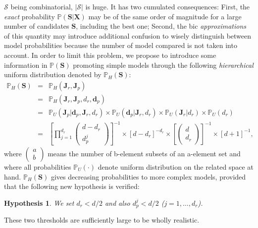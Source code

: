 \documentclass[12pt,a4paper]{report}
\newtheorem{hyp}{Hypothesis}
\begin{document}
	$\mathcal{S}$ being combinatorial, $|\mathcal{S}|$ is huge. It has two cumulated consequences: First, the {\it exact} probability $\mathbb{P}(\boldsymbol{S}|\boldsymbol{X})$ may be of the same order of magnitude for a large number of candidates  $\boldsymbol{S}$, including the best one; Second, the {\sc bic} {\it approximations} of this quantity may introduce additional confusion to wisely distinguish between model probabilities because the number of model compared is not taken into account\cite{massart2007concentration}. In order to limit this problem, we propose to introduce some information in $\mathbb{P}(\boldsymbol{S})$ promoting simple models through the following {\it hierarchical} uniform distribution denoted by $\mathbb{P}_H(\boldsymbol{S})$:
\begin{eqnarray}
\mathbb{P}_H(\boldsymbol{S}) & = & \mathbb{P}_H(\boldsymbol{J}_r,\boldsymbol{J}_p) \\
 & = & \mathbb{P}_H(\boldsymbol{J}_r,\boldsymbol{J}_p,d_r,\boldsymbol{d}_p) \\
 & = & \mathbb{P}_U(\boldsymbol{J}_p|\boldsymbol{d}_p,\boldsymbol{J}_r,d_r) \times \mathbb{P}_U(\boldsymbol{d}_p|\boldsymbol{J}_r,d_r) \times \mathbb{P}_U(\boldsymbol{J}_r|d_r)\times \mathbb{P}_U(d_r) \\
 & = & \left[\prod_{j=1}^{d_r} \left(\begin{array}{c} d-d_r \\ d_p^j \end{array}\right) \right]^{-1} \times \left[d-d_r\right]^{-d_r} \times \left[\left(\begin{array}{c} d \\ d_r \end{array} \right)\right]^{-1} \times [d+1]^{-1},
\end{eqnarray}
where $\left(\begin{array}{c} a \\ b \end{array}\right)$ means the number of b-element subsets of an a-element set and where all probabilities $\mathbb{P}_U(\cdot)$ denote uniform distribution on the related space at hand. $\mathbb{P}_H(\boldsymbol{S})$ gives decreasing probabilities to more complex models, provided that the following new hypothesis is verified:

\begin{hyp}\label{H5}
We set $d_r<d/2$ and also $d_p^j<d/2$ ($j=1,\ldots,d_r$).
\end{hyp}

These two thresholds are sufficiently large to be wholly realistic.
\end{document}
